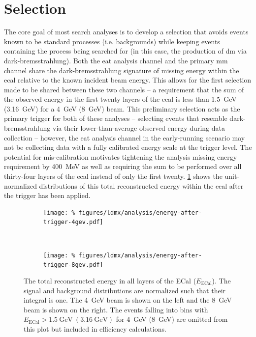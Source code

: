 \section{Selection}
The core goal of most search analyses is to develop a selection that avoids events known to be
standard processes (i.e. backgrounds) while keeping events containing the process being searched
for (in this case, the production of \ac{dm} via dark-bremsstrahlung).
Both the \ac{eat} analysis channel and the primary \ac{mm} channel share the dark-bremsstrahlung
signature of missing energy within the \ac{ecal} relative to the known incident beam energy.
This allows for the first selection made to be shared between these two channels -- 
a requirement that the sum of the observed energy in the first twenty layers of the \ac{ecal}
is less than \qty{1.5}{\GeV} (\qty{3.16}{\GeV}) for a \qty{4}{\GeV} (\qty{8}{\GeV}) beam.
This preliminary selection acts as the primary trigger for both of these analyses --
selecting events that resemble dark-bremsstrahlung via their lower-than-average
observed energy during data collection -- however, the \ac{eat} analysis channel in the early-running
scenario may not be collecting data with a fully calibrated energy scale at the trigger level.
The potential for mis-calibration motivates tightening the analysis missing energy requirement
by \qty{400}{\mega\electronvolt} as well as requiring the sum to be performed over all thirty-four
layers of the \ac{ecal} instead of only the first twenty.
\cref{fig:energy-after-trigger} shows the unit-normalized distributions of this total reconstructed
energy within the \ac{ecal} after the trigger has been applied.

\begin{figure}
    \centering
    \begin{subfigure}{0.48\textwidth}
         \texttt{[image: \%
           figures/ldmx/analysis/energy-after-trigger-4gev.pdf]}
    \end{subfigure}
    ~
    \begin{subfigure}{0.48\textwidth}
         \texttt{[image: \%
           figures/ldmx/analysis/energy-after-trigger-8gev.pdf]}
    \end{subfigure}
    \caption{
    The total reconstructed energy in all layers of the ECal ($E_\text{ECal}$).
    The signal and background distributions are normalized such that their integral is one.
    The \qty{4}{\GeV} beam is shown on the left and the \qty{8}{\GeV} beam is shown
    on the right.
    The events falling into bins with $E_\text{ECal} > \qty{1.5}{\GeV}~(\qty{3.16}{\GeV})$
    for \qty{4}{\GeV} (\qty{8}{GeV}) are omitted from this plot but included in efficiency calculations.
    }
    \label{fig:energy-after-trigger}
\end{figure}

